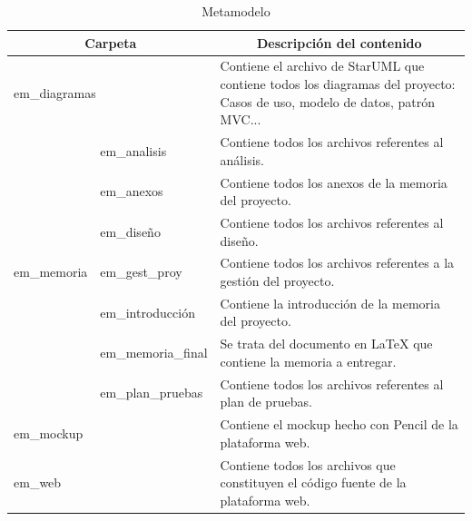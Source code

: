 \begin{table}[htpb]
\centering
\caption{Metamodelo}
\label{tab_metamodelo}
\begin{tabularx}{\textwidth}{|l|l|X|}
\hline
\multicolumn{2}{|c|}{Carpeta}                     & \multicolumn{1}{c|}{Descripción del contenido}                                                                             \\ \hline
\multicolumn{2}{|X|}{em\_diagramas}               & Contiene el archivo de StarUML que contiene todos los diagramas del proyecto: Casos de uso, modelo de datos, patrón MVC... \\ \hline
\multirow{7}{*}{em\_memoria} & em\_analisis       & Contiene todos los archivos referentes al análisis.                                                                        \\ \cline{2-3} 
                             & em\_anexos         & Contiene todos los anexos de la memoria del proyecto.                                                                      \\ \cline{2-3} 
                             & em\_diseño         & Contiene todos los archivos referentes al diseño.                                                                          \\ \cline{2-3} 
                             & em\_gest\_proy     & Contiene todos los archivos referentes a la gestión del proyecto.                                                          \\ \cline{2-3} 
                             & em\_introducción   & Contiene la introducción de la memoria del proyecto.                                                                       \\ \cline{2-3} 
                             & em\_memoria\_final & Se trata del documento en LaTeX que contiene la memoria a entregar.                                                        \\ \cline{2-3} 
                             & em\_plan\_pruebas  & Contiene todos los archivos referentes al plan de pruebas.                                                                 \\ \hline
\multicolumn{2}{|X|}{em\_mockup}                  & Contiene el mockup hecho con Pencil de la plataforma web.                                                                  \\ \hline
\multicolumn{2}{|X|}{em\_web}                     & Contiene todos los archivos que constituyen el código fuente de la plataforma web.                                         \\ \hline
\end{tabularx}
\end{table}

